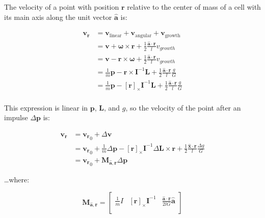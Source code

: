 \documentclass{report}
\renewcommand{\vec}[1]{\mathbf{#1}}
\let\oldhat\hat
\renewcommand{\hat}[1]{\oldhat{\mathbf{#1}}}
\newcommand{\deltav}{\Delta \vec{v}}
\newcommand{\deltap}{\Delta \vec{p}}
\newcommand{\deltaL}{\Delta \vec{L}}
\newcommand{\deltag}{\Delta g}
\newcommand{\IInv}{\mathbf{I}^{-1}}
\newcommand{\w}{\boldsymbol{\omega}}
\newcommand{\rx}{{\left[\vec{r}\right]}_\times}
\begin{document}
\begin{figure}
\end{figure}

The velocity of a point with position $\vec{r}$ relative to the center
of mass of a cell with its main axis along the unit vector $\hat{a}$
is:

\begin{align*}
\vec{v_r} &= \vec{v}_\textrm{linear} + \vec{v}_\textrm{angular} + \vec{v}_\textrm{growth} \\
&= \vec{v} + \vec{\w} \times \vec{r} + \frac{1}{2} \frac{\hat{a} \cdot \vec{r}}{l} v_{growth} \\
&= \vec{v} - \vec{r} \times \vec{\w} + \frac{1}{2} \frac{\hat{a} \cdot \vec{r}}{l} v_{growth} \\
&= \frac{1}{m}\vec{p} - \vec{r} \times \IInv\vec{L} + \frac{1}{2} \frac{\hat{a} \cdot \vec{r}}{l} \frac{g}{G} \\
&= \frac{1}{m}\vec{p} - \rx \IInv\vec{L} + \frac{1}{2} \frac{\hat{a} \cdot \vec{r}}{l} \frac{g}{G} \\
\end{align*}

This expression is linear in $\vec{p}$, $\vec{L}$, and $g$, so the
velocity of the point after an impulse $\deltap$ is:

\begin{align*}
\vec{v_r} &= \vec{v_r}_0 + \deltav \\
&= \vec{v_r}_0 + \frac{1}{m}\deltap - \rx\IInv\deltaL \times \vec{r} + \frac{1}{2} \frac{\hat{x} \cdot \vec{r}}{l} \frac{\deltag}{G} \\
&= \vec{v_r}_0 + \vec{M}_{\hat{a},{\vec{r}}} \deltap
\end{align*}

\dots where:

\[
\vec{M}_{\hat{a},{\vec{r}}}
=
\left[
\begin{array}{ccc}
\frac{1}{m}I & \rx\IInv & \frac{\hat{a}\cdot\vec{r}}{2lG}\hat{a}\\
\end{array}
\right]
\]
\end{document}
